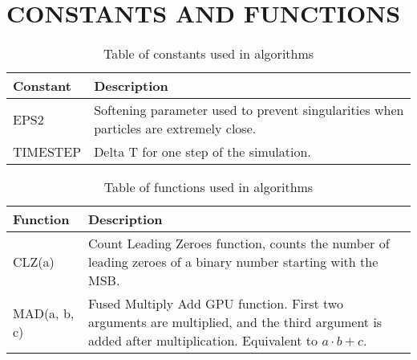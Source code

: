\documentclass{thesis}
\begin{document}
\chapter{CONSTANTS AND FUNCTIONS}
\begin{table}[!h]
    \centering
    \caption{Table of constants used in algorithms}
    \label{tab:Constants}
    \begin{tabular}{|p{3cm}|p{10cm}|}
        \hline
        Constant & Description \\
        \hline\hline
        EPS2 & Softening parameter used to prevent singularities when particles are extremely close.\\
        \hline
        TIMESTEP & Delta T for one step of the simulation.\\
        \hline
    \end{tabular}
\end{table}
\begin{table}[!h]
    \centering
    \caption{Table of functions used in algorithms}
    \label{tab:Functions}
    \begin{tabular}{|p{3cm}|p{10cm}|}
        \hline
        Function & Description \\
        \hline\hline
        CLZ(a) & Count Leading Zeroes function, counts the number of leading zeroes of a binary number starting with the MSB.\\
        \hline
        MAD(a, b, c) & Fused Multiply Add GPU function. First two arguments are multiplied, and the third argument is added after multiplication. Equivalent to $a \cdot b + c$.\\
        \hline
    \end{tabular}
\end{table}

\end{document}
